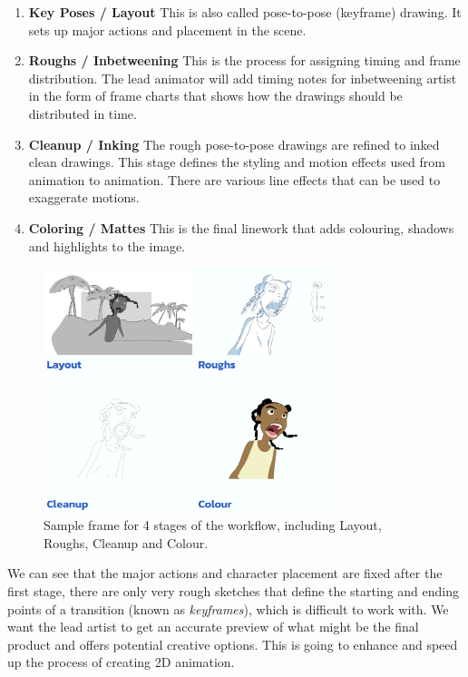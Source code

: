 \begin{enumerate}
    \item \textbf{Key Poses / Layout} This is also called pose-to-pose (keyframe) drawing. It sets up major actions and placement in the scene.
    \item \textbf{Roughs / Inbetweening} This is the process for assigning timing and frame distribution. The lead animator will add timing notes for inbetweening artist in the form of frame charts that shows how the drawings should be distributed in time.
    \item \textbf{Cleanup / Inking} The rough pose-to-pose drawings are refined to inked clean drawings. This stage defines the styling and motion effects used from animation to animation. There are various line effects that can be used to exaggerate motions.
    \item \textbf{Coloring / Mattes} This is the final linework that adds colouring, shadows and highlights to the image.
\end{enumerate}

\begin{figure}
    \centering
    \includegraphics[width=0.75\textwidth]{images/introduction/stages.png}
    \caption[Sample frame for 4 stages of the workflow, including Layout, Roughs, Cleanup and Colour.]{Sample frame for 4 stages of the workflow, including Layout, Roughs, Cleanup and Colour.} 
    \label{fig:stages}
\end{figure}

We can see that the major actions and character placement are fixed after the first stage, there are only very rough sketches that define the starting and ending points of a transition (known as \textit{keyframes}), which is difficult to work with. We want the lead artist to get an accurate preview of what might be the final product and offers potential creative options. This is going to enhance and speed up the process of creating 2D animation.

